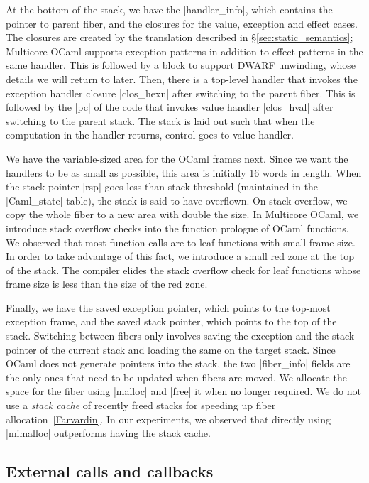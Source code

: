 \documentclass[sigplan,10pt,review,anonymous]{acmart}\settopmatter{printfolios=true,printccs=false,printacmref=false}
\begin{document}
At the bottom of the stack, we have the |handler_info|, which contains the
pointer to parent fiber, and the closures for the value, exception and effect
cases. The closures are created by the translation described in
\S\ref{sec:static_semantics}; Multicore OCaml supports exception patterns in
addition to effect patterns in the same handler. This is followed by a block to
support DWARF unwinding, whose details we will return to later. Then, there is
a top-level handler that invokes the exception handler closure |clos_hexn|
after switching to the parent fiber. This is followed by the |pc| of the code
that invokes value handler |clos_hval| after switching to the parent stack. The
stack is laid out such that when the computation in the handler returns,
control goes to value handler.

We have the variable-sized area for the OCaml frames next. Since we want the
handlers to be as small as possible, this area is initially 16 words in length.
When the stack pointer |rsp| goes less than stack threshold (maintained in the
|Caml_state| table), the stack is said to have overflown. On stack overflow, we
copy the whole fiber to a new area with double the size. In Multicore OCaml, we
introduce stack overflow checks into the function prologue of OCaml functions.
We observed that most function calls are to leaf functions with small frame
size. In order to take advantage of this fact, we introduce a small red zone at
the top of the stack. The compiler elides the stack overflow check for leaf
functions whose frame size is less than the size of the red zone.

Finally, we have the saved exception pointer, which points to the top-most
exception frame, and the saved stack pointer, which points to the top of the
stack. Switching between fibers only involves saving the exception and the
stack pointer of the current stack and loading the same on the target stack.
Since OCaml does not generate pointers into the stack, the two |fiber_info|
fields are the only ones that need to be updated when fibers are moved. We
allocate the space for the fiber using |malloc| and |free| it when no longer
required. We do not use a \emph{stack cache} of recently freed stacks for
speeding up fiber allocation~\ref{Farvardin}. In our experiments, we observed
that directly using |mimalloc| outperforms having the stack cache.

\subsection{External calls and callbacks}
\end{document}
